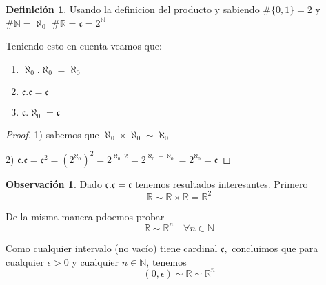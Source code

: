 \documentclass[12pt]{article}
\newcommand{\n}{\aleph_{0}}
\newcommand{\R}{\mathbb{R}}
\newcommand{\N}{\mathbb{N}}
\theoremstyle{definition}
\newtheorem{definition}{Definición}[section]
\newtheorem*{remark}{Observación}
\begin{document}
\begin{definition}
 Usando la definicion del producto y sabiendo $\# \{0,1\} = 2$ y $\# \N = \n$
  $\# \R = \mathfrak{c} = 2^{\N}$ 

  Teniendo esto en cuenta veamos que:

  \begin{enumerate}
    \item $\n.\n = \n$
    \item $\mathfrak{c}.\mathfrak{c} = \mathfrak{c}$
    \item $\mathfrak{c}.\n = \mathfrak{c}$
    \end{enumerate}

    \begin{proof}
    1) sabemos que $\n \times \n \sim \n$

  2) $\mathfrak{c}.\mathfrak{c} = \mathfrak{c}^2 = (2^{\n})^2 = 2^{\n.2} = 2^{\n + \n} = 2 ^{\n} = \mathfrak{c}$
  \end{proof} 
\end{definition}

\begin{remark}
  Dado $\mathfrak{c}.\mathfrak{c} = \mathfrak{c}$ tenemos resultados interesantes. 
  Primero $$\R \sim \R \times \R = \R^2$$

  De la misma manera pdoemos probar $$\R \sim \R^n \quad \forall n \in \N $$

Como cualquier intervalo (no vacío) tiene cardinal $\mathfrak{c},$ concluimos que para cualquier $\epsilon > 0$ y cualquier $n \in \N$, tenemos $$(0,\epsilon)\sim \R \sim \R^n$$
\end{remark}
\end{document}
